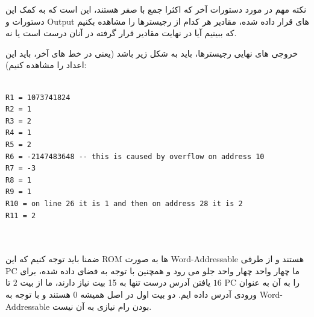 \documentclass[12pt,titlepage,a4page , tikz , multi,table , svgnames,xcdraw]{article}
\begin{document}
نکته مهم در مورد دستورات آخر که اکثرا جمع با صفر هستند، این است که به کمک این دستورات و Output های قرار داده شده، مقادیر هر کدام از رجیسترها را مشاهده بکنیم که ببینیم آیا در نهایت مقادیر قرار گرفته در آنان درست است یا نه.

خروجی های نهایی رجیسترها، باید به شکل زیر باشد (یعنی در خط های آخر، باید این اعداد را مشاهده کنیم):

\begin{latin}

\begin{verbatim}

R1 = 1073741824
R2 = 1
R3 = 2
R4 = 1
R5 = 2
R6 = -2147483648 -- this is caused by overflow on address 10
R7 = -3
R8 = 1
R9 = 1
R10 = on line 26 it is 1 and then on address 28 it is 2
R11 = 2



\end{verbatim}


\end{latin}

ضمنا باید توجه کنیم که این ROM ها به صورت Word-Addressable هستند و از طرفی PC ما چهار واحد چهار واحد جلو می رود و همچنین با توجه به فضای داده شده، برای یافتن آدرس درست تنها به 15 بیت نیاز دارند، ما از بیت $2$ تا $16$ PC را به آن به عنوان ورودی آدرس داده ایم. دو بیت اول در اصل همیشه $0$ هستند و با توجه به Word-Addressable بودن رام نیازی به آن نیست.


\newpage
\end{document}
